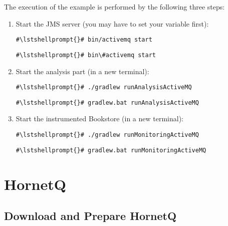  The execution of the example is performed by the following three steps:
\begin{enumerate}
\item Start the JMS server (you may have to set your  variable first):

\setBashListing
\begin{lstlisting}[caption=Start of the JMS server under UNIX-like systems]
#\lstshellprompt{}# bin/activemq start
\end{lstlisting}
\begin{lstlisting}[caption=Start of the JMS server under Windows]
#\lstshellprompt{}# bin\#activemq start
\end{lstlisting}
\item Start the analysis part (in a new terminal):
\setBashListing
\begin{lstlisting}[caption=Start the analysis part under UNIX-like systems]
#\lstshellprompt{}# ./gradlew runAnalysisActiveMQ
\end{lstlisting}
\begin{lstlisting}[caption=Start the analysis part under Windows]
#\lstshellprompt{}# gradlew.bat runAnalysisActiveMQ
\end{lstlisting}
\item Start the instrumented Bookstore (in a new terminal):
\setBashListing
\begin{lstlisting}[caption=Start the analysis part under UNIX-like systems]
#\lstshellprompt{}# ./gradlew runMonitoringActiveMQ
\end{lstlisting}
\begin{lstlisting}[caption=Start the analysis part under Windows]
#\lstshellprompt{}# gradlew.bat runMonitoringActiveMQ
\end{lstlisting}
\end{enumerate}


\section{HornetQ}\label{example:jms:hornetq}

\subsection{Download and Prepare HornetQ}


